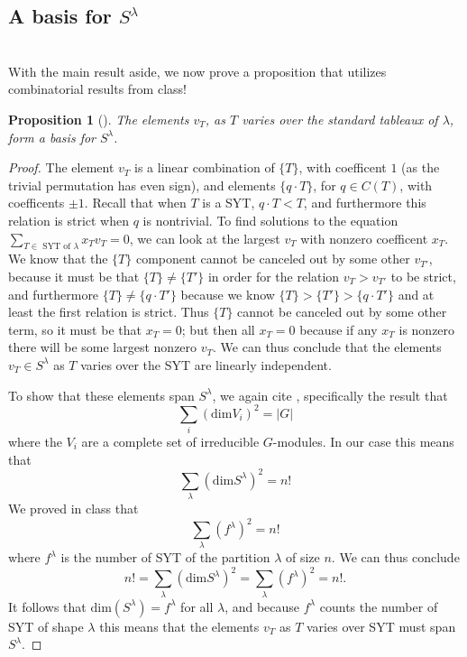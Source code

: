 \documentclass[12pt,twoside]{reedthesis}
\theoremstyle{plain}   %
\newtheorem{prop}{Proposition}[section]
\theoremstyle{definition}
\theoremstyle{remark}
\numberwithin{equation}{section}
\def\dim{\mathrm{dim}}
\begin{document}
  \subsection{A basis for $S^\lambda$} \hfill\\
  With the main result aside, we now prove a proposition that utilizes combinatorial results from class!
  \begin{prop}[{\cite[Pg. 88]{fulton}}]\label{prop1}
    The elements $v_T$, as $T$ varies over the \emph{standard} tableaux of $\lambda$, form a basis for $S^\lambda$.
  \end{prop}
  \begin{proof}
    The element $v_T$ is a linear combination of $\{T\}$, with coefficent $1$ (as the trivial permutation has even sign),
    and elements $\{q \cdot T\}$, for $q \in C(T)$, with coefficents $\pm 1$.
    Recall that when $T$ is a SYT, $q \cdot T < T$, and furthermore this relation is strict when $q$ is nontrivial.
    To find solutions to the equation $\sum_{T \in \text{ SYT of $\lambda$}} x_Tv_T = 0$,
    we can look at the largest $v_T$ with nonzero coefficent $x_T$.
    We know that the $\{T\}$ component cannot be canceled out by some other $v_{T'}$, because it must be that $\{T\} \neq \{T'\}$ in
    order for the relation $v_T > v_{T'}$ to be strict,
    and furthermore $\{T\} \neq \{q \cdot T'\}$ because we know $\{ T\} > \{T'\} > \{q \cdot T'\}$ and at least the first relation is strict.
    Thus $\{T\}$ cannot be canceled out by some other term, so it must be that $x_T = 0$; but then all $x_T = 0$ because
    if any $x_T$ is nonzero there will be some largest nonzero $v_T$.
    We can thus conclude that the elements $v_T \in S^\lambda$ as $T$ varies over the SYT are linearly independent. \par
    To show that these elements span $S^\lambda$, we again cite \cite[Proposition 1.10.1]{sagan}, specifically the result
    that
    \[ \sum_i (\dim V_i)^2 =|G| \]
    where the $V_i$ are a complete set of irreducible $G$-modules.
    In our case this means that
    \[\sum_\lambda (\dim S^\lambda)^2 = n!\]
    We proved in class that 
    \[ \sum_\lambda(f^\lambda)^2 = n!\]
    where $f^\lambda$ is the number of SYT of the partition $\lambda$ of size $n$.
    We can thus conclude
    \[ n! = \sum_\lambda (\dim S^\lambda)^2 = \sum_\lambda(f^\lambda)^2 = n!.\]
    It follows that $\dim(S^\lambda) = f^\lambda$ for all $\lambda$, and because $f^\lambda$ counts the number of SYT of shape $\lambda$
    this means that the elements $v_T$ as $T$ varies over SYT must span $S^\lambda$.
  \end{proof}
\end{document}
